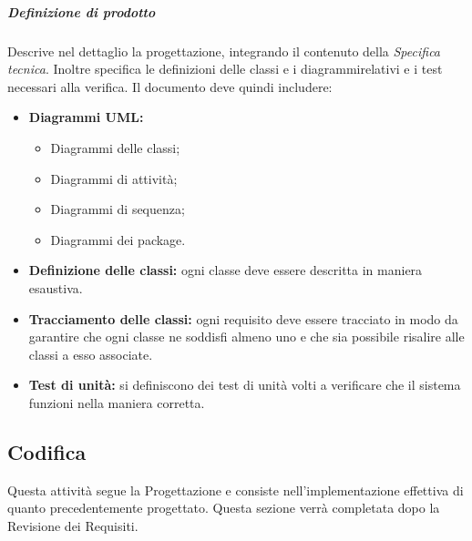\subparagraph{Definizione di prodotto}
Descrive nel dettaglio la progettazione, integrando il contenuto della \textit{Specifica tecnica}. Inoltre specifica le definizioni delle classi e i diagrammirelativi e i test necessari alla verifica. Il documento deve quindi includere:
\begin{itemize}
	\item \textbf{Diagrammi UML:}
	\begin{itemize}
		\item Diagrammi delle classi;
		\item Diagrammi di attività;
		\item Diagrammi di sequenza;
		\item Diagrammi dei package.
	\end{itemize}
	\item \textbf{Definizione delle classi:} ogni classe deve essere descritta in maniera esaustiva.
	\item \textbf{Tracciamento delle classi:} ogni requisito deve essere tracciato in modo da garantire che ogni classe ne soddisfi almeno uno e che sia possibile risalire alle classi a esso associate.
	\item \textbf{Test di unità:} si definiscono dei test di unità volti a verificare che il sistema funzioni nella maniera corretta.
\end{itemize}




\subsection{Codifica}
Questa attività segue la Progettazione e consiste nell'implementazione effettiva di quanto precedentemente progettato.
Questa sezione verrà completata dopo la Revisione dei Requisiti.
